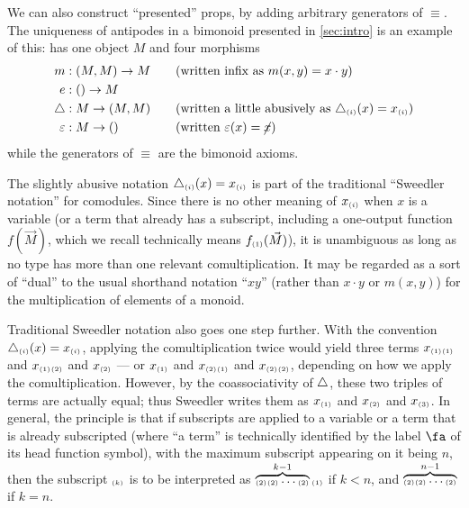 \begin{props}
We can also construct ``presented'' props, by adding arbitrary generators of $\equiv$.
The uniqueness of antipodes in a bimonoid presented in \cref{sec:intro} is an example of this: \cG has one object $M$ and four morphisms
\begin{alignat*}{2}
m&:(M,M)\to M &&\quad\text{(written infix as $m(x,y) = x\cdot y$)}\\
e&:()\to M\\
\triangle&:M\to (M,M) &&\quad\text{(written a little abusively as $\triangle_{\scriptscriptstyle(i)}(x) = x_{\scriptscriptstyle(i)}$)}\\
\varepsilon &:M\to () &&\quad\text{(written $\varepsilon(x) = \cancel{x}$)}
\end{alignat*}
while the generators of $\equiv$ are the bimonoid axioms.

The slightly abusive notation $\triangle_{\scriptscriptstyle(i)}(x) = x_{\scriptscriptstyle(i)}$ is part of the traditional ``Sweedler notation'' for comodules.
Since there is no other meaning of $x_{\scriptscriptstyle(i)}$ when $x$ is a variable (or a term that already has a subscript, including a one-output function $f(\vec M)$, which we recall technically means $f_{\scriptscriptstyle(1)}(\vec M)$), it is unambiguous as long as no type has more than one relevant comultiplication.
It may be regarded as a sort of ``dual'' to the usual shorthand notation ``$x y$'' (rather than $x\cdot y$ or $m(x,y)$) for the multiplication of elements of a monoid.

Traditional Sweedler notation also goes one step further.
With the convention $\triangle_{\scriptscriptstyle(i)}(x) = x_{\scriptscriptstyle(i)}$, applying the comultiplication twice would yield three terms $x_{\scriptscriptstyle(1)}{}_{\scriptscriptstyle(1)}$ and $x_{\scriptscriptstyle(1)}{}_{\scriptscriptstyle(2)}$ and $x_{\scriptscriptstyle(2)}$ --- or $x_{\scriptscriptstyle(1)}$ and $x_{\scriptscriptstyle(2)}{}_{\scriptscriptstyle(1)}$ and $x_{\scriptscriptstyle(2)}{}_{\scriptscriptstyle(2)}$, depending on how we apply the comultiplication.
However, by the coassociativity of $\triangle$, these two triples of terms are actually equal; thus Sweedler writes them as $x_{\scriptscriptstyle(1)}$ and $x_{\scriptscriptstyle(2)}$ and $x_{\scriptscriptstyle(3)}$.
In general, the principle is that if subscripts are applied to a variable or a term that is already subscripted (where ``a term'' is technically identified by the label $\fa$ of its head function symbol), with the maximum subscript appearing on it being $n$, then the subscript ${}_{\scriptscriptstyle(k)}$ is to be interpreted as $\overbrace{{}_{\scriptscriptstyle(2)}{}_{\scriptscriptstyle(2)}\dots{}_{\scriptscriptstyle(2)}}^{k-1}{}_{\scriptscriptstyle(1)}$ if $k<n$, and $\overbrace{{}_{\scriptscriptstyle(2)}{}_{\scriptscriptstyle(2)}\dots{}_{\scriptscriptstyle(2)}}^{n-1}$ if $k=n$.


\end{props}
